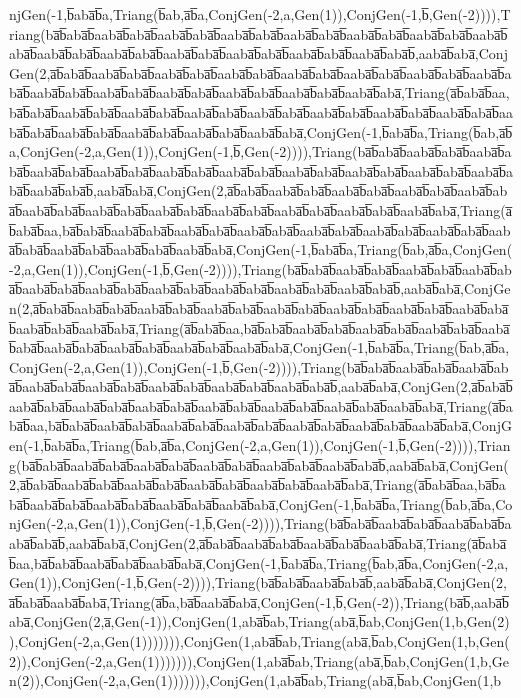 njGen(-1,b̅aba̅b̅a,Triang(b̅ab,a̅b̅a,ConjGen(-2,a,Gen(1)),ConjGen(-1,b̅,Gen(-2)))),Triang(ba̅b̅aba̅b̅aaba̅b̅aba̅b̅aaba̅b̅aba̅b̅aaba̅b̅aba̅b̅aaba̅b̅aba̅b̅aaba̅b̅aba̅b̅aaba̅b̅aba̅b̅aaba̅b̅aba̅b̅aaba̅b̅aba̅b̅aaba̅b̅aba̅b̅aaba̅b̅aba̅b̅aaba̅b̅aba̅b̅aaba̅b̅aba̅b̅aaba̅b̅aba̅b̅,aaba̅b̅aba̅,ConjGen(2,a̅b̅aba̅b̅aaba̅b̅aba̅b̅aaba̅b̅aba̅b̅aaba̅b̅aba̅b̅aaba̅b̅aba̅b̅aaba̅b̅aba̅b̅aaba̅b̅aba̅b̅aaba̅b̅aba̅b̅aaba̅b̅aba̅b̅aaba̅b̅aba̅b̅aaba̅b̅aba̅b̅aaba̅b̅aba̅b̅aaba̅b̅aba̅b̅aaba̅b̅aba̅,Triang(a̅b̅aba̅b̅aa,ba̅b̅aba̅b̅aaba̅b̅aba̅b̅aaba̅b̅aba̅b̅aaba̅b̅aba̅b̅aaba̅b̅aba̅b̅aaba̅b̅aba̅b̅aaba̅b̅aba̅b̅aaba̅b̅aba̅b̅aaba̅b̅aba̅b̅aaba̅b̅aba̅b̅aaba̅b̅aba̅b̅aaba̅b̅aba̅b̅aaba̅b̅aba̅,ConjGen(-1,b̅aba̅b̅a,Triang(b̅ab,a̅b̅a,ConjGen(-2,a,Gen(1)),ConjGen(-1,b̅,Gen(-2)))),Triang(ba̅b̅aba̅b̅aaba̅b̅aba̅b̅aaba̅b̅aba̅b̅aaba̅b̅aba̅b̅aaba̅b̅aba̅b̅aaba̅b̅aba̅b̅aaba̅b̅aba̅b̅aaba̅b̅aba̅b̅aaba̅b̅aba̅b̅aaba̅b̅aba̅b̅aaba̅b̅aba̅b̅aaba̅b̅aba̅b̅,aaba̅b̅aba̅,ConjGen(2,a̅b̅aba̅b̅aaba̅b̅aba̅b̅aaba̅b̅aba̅b̅aaba̅b̅aba̅b̅aaba̅b̅aba̅b̅aaba̅b̅aba̅b̅aaba̅b̅aba̅b̅aaba̅b̅aba̅b̅aaba̅b̅aba̅b̅aaba̅b̅aba̅b̅aaba̅b̅aba̅b̅aaba̅b̅aba̅,Triang(a̅b̅aba̅b̅aa,ba̅b̅aba̅b̅aaba̅b̅aba̅b̅aaba̅b̅aba̅b̅aaba̅b̅aba̅b̅aaba̅b̅aba̅b̅aaba̅b̅aba̅b̅aaba̅b̅aba̅b̅aaba̅b̅aba̅b̅aaba̅b̅aba̅b̅aaba̅b̅aba̅b̅aaba̅b̅aba̅,ConjGen(-1,b̅aba̅b̅a,Triang(b̅ab,a̅b̅a,ConjGen(-2,a,Gen(1)),ConjGen(-1,b̅,Gen(-2)))),Triang(ba̅b̅aba̅b̅aaba̅b̅aba̅b̅aaba̅b̅aba̅b̅aaba̅b̅aba̅b̅aaba̅b̅aba̅b̅aaba̅b̅aba̅b̅aaba̅b̅aba̅b̅aaba̅b̅aba̅b̅aaba̅b̅aba̅b̅aaba̅b̅aba̅b̅,aaba̅b̅aba̅,ConjGen(2,a̅b̅aba̅b̅aaba̅b̅aba̅b̅aaba̅b̅aba̅b̅aaba̅b̅aba̅b̅aaba̅b̅aba̅b̅aaba̅b̅aba̅b̅aaba̅b̅aba̅b̅aaba̅b̅aba̅b̅aaba̅b̅aba̅b̅aaba̅b̅aba̅,Triang(a̅b̅aba̅b̅aa,ba̅b̅aba̅b̅aaba̅b̅aba̅b̅aaba̅b̅aba̅b̅aaba̅b̅aba̅b̅aaba̅b̅aba̅b̅aaba̅b̅aba̅b̅aaba̅b̅aba̅b̅aaba̅b̅aba̅b̅aaba̅b̅aba̅,ConjGen(-1,b̅aba̅b̅a,Triang(b̅ab,a̅b̅a,ConjGen(-2,a,Gen(1)),ConjGen(-1,b̅,Gen(-2)))),Triang(ba̅b̅aba̅b̅aaba̅b̅aba̅b̅aaba̅b̅aba̅b̅aaba̅b̅aba̅b̅aaba̅b̅aba̅b̅aaba̅b̅aba̅b̅aaba̅b̅aba̅b̅aaba̅b̅aba̅b̅,aaba̅b̅aba̅,ConjGen(2,a̅b̅aba̅b̅aaba̅b̅aba̅b̅aaba̅b̅aba̅b̅aaba̅b̅aba̅b̅aaba̅b̅aba̅b̅aaba̅b̅aba̅b̅aaba̅b̅aba̅b̅aaba̅b̅aba̅,Triang(a̅b̅aba̅b̅aa,ba̅b̅aba̅b̅aaba̅b̅aba̅b̅aaba̅b̅aba̅b̅aaba̅b̅aba̅b̅aaba̅b̅aba̅b̅aaba̅b̅aba̅b̅aaba̅b̅aba̅,ConjGen(-1,b̅aba̅b̅a,Triang(b̅ab,a̅b̅a,ConjGen(-2,a,Gen(1)),ConjGen(-1,b̅,Gen(-2)))),Triang(ba̅b̅aba̅b̅aaba̅b̅aba̅b̅aaba̅b̅aba̅b̅aaba̅b̅aba̅b̅aaba̅b̅aba̅b̅aaba̅b̅aba̅b̅,aaba̅b̅aba̅,ConjGen(2,a̅b̅aba̅b̅aaba̅b̅aba̅b̅aaba̅b̅aba̅b̅aaba̅b̅aba̅b̅aaba̅b̅aba̅b̅aaba̅b̅aba̅,Triang(a̅b̅aba̅b̅aa,ba̅b̅aba̅b̅aaba̅b̅aba̅b̅aaba̅b̅aba̅b̅aaba̅b̅aba̅b̅aaba̅b̅aba̅,ConjGen(-1,b̅aba̅b̅a,Triang(b̅ab,a̅b̅a,ConjGen(-2,a,Gen(1)),ConjGen(-1,b̅,Gen(-2)))),Triang(ba̅b̅aba̅b̅aaba̅b̅aba̅b̅aaba̅b̅aba̅b̅aaba̅b̅aba̅b̅,aaba̅b̅aba̅,ConjGen(2,a̅b̅aba̅b̅aaba̅b̅aba̅b̅aaba̅b̅aba̅b̅aaba̅b̅aba̅,Triang(a̅b̅aba̅b̅aa,ba̅b̅aba̅b̅aaba̅b̅aba̅b̅aaba̅b̅aba̅,ConjGen(-1,b̅aba̅b̅a,Triang(b̅ab,a̅b̅a,ConjGen(-2,a,Gen(1)),ConjGen(-1,b̅,Gen(-2)))),Triang(ba̅b̅aba̅b̅aaba̅b̅aba̅b̅,aaba̅b̅aba̅,ConjGen(2,a̅b̅aba̅b̅aaba̅b̅aba̅,Triang(a̅b̅a,ba̅b̅aaba̅b̅aba̅,ConjGen(-1,b̅,Gen(-2)),Triang(ba̅b̅,aaba̅b̅aba̅,ConjGen(2,a̅,Gen(-1)),ConjGen(1,aba̅b̅ab,Triang(aba̅,b̅ab,ConjGen(1,b,Gen(2)),ConjGen(-2,a,Gen(1))))))),ConjGen(1,aba̅b̅ab,Triang(aba̅,b̅ab,ConjGen(1,b,Gen(2)),ConjGen(-2,a,Gen(1))))))),ConjGen(1,aba̅b̅ab,Triang(aba̅,b̅ab,ConjGen(1,b,Gen(2)),ConjGen(-2,a,Gen(1))))))),ConjGen(1,aba̅b̅ab,Triang(aba̅,b̅ab,ConjGen(1,b